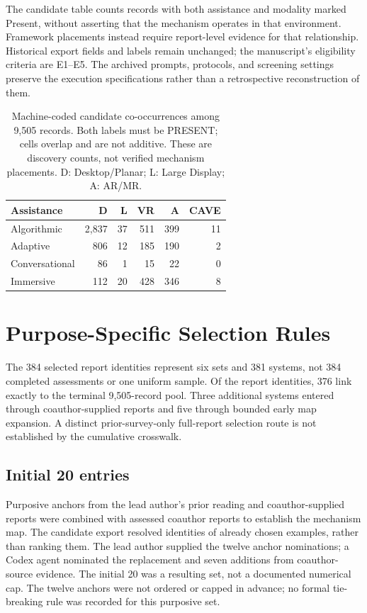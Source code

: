 \documentclass[11pt]{article}
\begin{document}
The candidate table counts records with both assistance and modality marked Present, without asserting that the mechanism operates in that environment. Framework placements instead require report-level evidence for that relationship. Historical export fields and labels remain unchanged; the manuscript's eligibility criteria are E1--E5. The archived prompts, protocols, and screening settings preserve the execution specifications rather than a retrospective reconstruction of them.

\begin{table}[t]
\centering\small
\caption{Machine-coded candidate co-occurrences among 9,505 records. Both labels must be PRESENT; cells overlap and are not additive. These are discovery counts, not verified mechanism placements. D: Desktop/Planar; L: Large Display; A: AR/MR.}
\label{tab:candidate-census}
\begin{tabular}{lrrrrr}\toprule
Assistance & D & L & VR & A & CAVE\\\midrule
Algorithmic & 2,837 & 37 & 511 & 399 & 11\\
Adaptive & 806 & 12 & 185 & 190 & 2\\
Conversational & 86 & 1 & 15 & 22 & 0\\
Immersive & 112 & 20 & 428 & 346 & 8\\\bottomrule
\end{tabular}
\end{table}


\section{Purpose-Specific Selection Rules}
The 384 selected report identities represent six sets and 381 systems, not 384 completed assessments or one uniform sample. Of the report identities, 376 link exactly to the terminal 9,505-record pool. Three additional systems entered through coauthor-supplied reports and five through bounded early map expansion. A distinct prior-survey-only full-report selection route is not established by the cumulative crosswalk.

\subsection{Initial 20 entries}
Purposive anchors from the lead author's prior reading and coauthor-supplied reports were combined with assessed coauthor reports to establish the mechanism map. The candidate export resolved identities of already chosen examples, rather than ranking them. The lead author supplied the twelve anchor nominations; a Codex agent nominated the replacement and seven additions from coauthor-source evidence. The initial 20 was a resulting set, not a documented numerical cap. The twelve anchors were not ordered or capped in advance; no formal tie-breaking rule was recorded for this purposive set.
\end{document}

